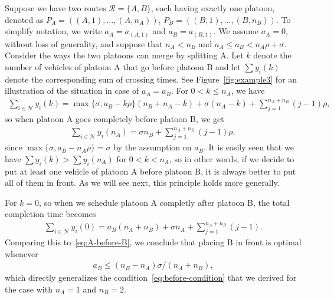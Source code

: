 \documentclass[a4paper]{article}
\theoremstyle{definition}
\theoremstyle{plain}
\begin{document}
\begin{eg}
  \label{example3}
  Suppose we have two routes $\mathcal{R} = \{ A, B \}$, each having exactly one
  platoon, denoted as $P_{A} = ((A,1), \dots, (A,n_{A}))$,
  $P_{B} = ((B,1), \dots, (B,n_{B}))$. To simplify notation, we write
  $a_{A} = a_{(A,1)}$ and $a_{B} = a_{(B,1)}$. We assume $a_{A} = 0$, without
  loss of generality, and suppose that $n_{A} < n_{B}$ and
  $a_{A} \leq a_{B} < n_{A}\rho + \sigma$. Consider the ways the two platoons
  can merge by splitting A. Let $k$ denote the number of vehicles of platoon A
  that go before platoon B and let $\sum y_{i}(k)$ denote the corresponding
  sum of crossing times. See Figure~\ref{fig:example3} for an illustration of the
  situation in case of $a_{A} = a_{B}$. For $0 < k \leq n_{A}$, we have
  \begin{align*}
    \sum_{i \in \mathcal{N}} y_{i} (k) = \max\{ \sigma, a_{B} - k\rho\} (n_{B} + n_{A} - k) + \sigma (n_{A} - k) + \sum_{j=1}^{n_{A}+n_{B}} (j-1) \rho ,
  \end{align*}
  so when platoon A goes completely before platoon B, we get
  \begin{align}
    \sum_{i \in \mathcal{N}} y_{i} (n_{A}) = \sigma n_{B} + \sum_{j=1}^{n_{A}+n_{B}} (j-1) \rho ,
    \label{eq:A-before-B}
  \end{align}
  since $\max\{ \sigma, a_{B} - n_{A} \rho \} = \sigma$ by the assumption on
  $a_{B}$. It is easily seen that we have $\sum y_{i}(k) > \sum y_{i} (n_{A})$
  for $0 < k < n_{A}$, so in other words, if we decide to put at least one
  vehicle of platoon A before platoon B, it is always better to put all of them
  in front. As we will see next, this principle holds more generally.

  For $k=0$, so when we schedule platoon A completly after platoon B, the total
  completion time becomes
  \begin{align*}
    \sum_{i \in \mathcal{N}} y_{i} (0) = a_{B} (n_{A} + n_{B}) + \sigma n_{A} + \sum_{j=1}^{n_{A}+n_{B}} (j-1) .
  \end{align*}
  Comparing this to~\eqref{eq:A-before-B}, we conclude that placing B in front
  is optimal whenever
  \begin{align*}
    a_{B} \leq (n_{B} - n_{A}) \sigma / (n_{A} + n_{B}) ,
  \end{align*}
  which directly generalizes the condition~\eqref{eq:before-condition} that we
  derived for the case with $n_{A} = 1$ and $n_{B} = 2$.
\end{eg}
\end{document}
